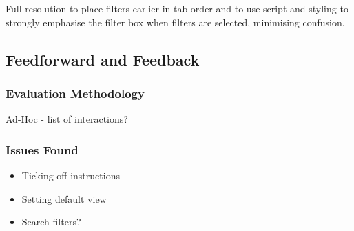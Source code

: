 Full resolution to place filters earlier in tab order and to use
script and styling to strongly emphasise the filter box when filters
are selected, minimising confusion.

\subsection{Feedforward and Feedback}

\subsubsection{Evaluation Methodology}

Ad-Hoc - list of interactions?

\subsubsection{Issues Found}

\begin{itemize}
\item Ticking off instructions
\item Setting default view
\item Search filters?
\end{itemize}
